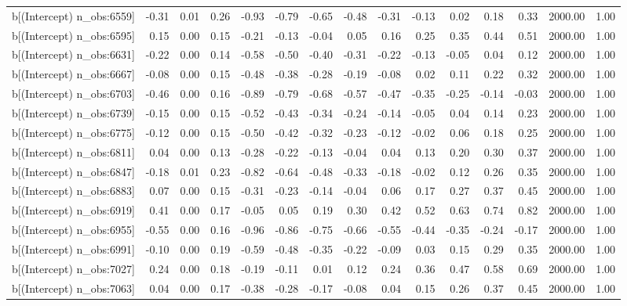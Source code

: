 \begin{table}[ht]
\begin{tabular}{rrrrrrrrrrrrrrr}
  b[(Intercept) n\_obs:6559] & -0.31 & 0.01 & 0.26 & -0.93 & -0.79 & -0.65 & -0.48 & -0.31 & -0.13 & 0.02 & 0.18 & 0.33 & 2000.00 & 1.00 \\ 
  b[(Intercept) n\_obs:6595] & 0.15 & 0.00 & 0.15 & -0.21 & -0.13 & -0.04 & 0.05 & 0.16 & 0.25 & 0.35 & 0.44 & 0.51 & 2000.00 & 1.00 \\ 
  b[(Intercept) n\_obs:6631] & -0.22 & 0.00 & 0.14 & -0.58 & -0.50 & -0.40 & -0.31 & -0.22 & -0.13 & -0.05 & 0.04 & 0.12 & 2000.00 & 1.00 \\ 
  b[(Intercept) n\_obs:6667] & -0.08 & 0.00 & 0.15 & -0.48 & -0.38 & -0.28 & -0.19 & -0.08 & 0.02 & 0.11 & 0.22 & 0.32 & 2000.00 & 1.00 \\ 
  b[(Intercept) n\_obs:6703] & -0.46 & 0.00 & 0.16 & -0.89 & -0.79 & -0.68 & -0.57 & -0.47 & -0.35 & -0.25 & -0.14 & -0.03 & 2000.00 & 1.00 \\ 
  b[(Intercept) n\_obs:6739] & -0.15 & 0.00 & 0.15 & -0.52 & -0.43 & -0.34 & -0.24 & -0.14 & -0.05 & 0.04 & 0.14 & 0.23 & 2000.00 & 1.00 \\ 
  b[(Intercept) n\_obs:6775] & -0.12 & 0.00 & 0.15 & -0.50 & -0.42 & -0.32 & -0.23 & -0.12 & -0.02 & 0.06 & 0.18 & 0.25 & 2000.00 & 1.00 \\ 
  b[(Intercept) n\_obs:6811] & 0.04 & 0.00 & 0.13 & -0.28 & -0.22 & -0.13 & -0.04 & 0.04 & 0.13 & 0.20 & 0.30 & 0.37 & 2000.00 & 1.00 \\ 
  b[(Intercept) n\_obs:6847] & -0.18 & 0.01 & 0.23 & -0.82 & -0.64 & -0.48 & -0.33 & -0.18 & -0.02 & 0.12 & 0.26 & 0.35 & 2000.00 & 1.00 \\ 
  b[(Intercept) n\_obs:6883] & 0.07 & 0.00 & 0.15 & -0.31 & -0.23 & -0.14 & -0.04 & 0.06 & 0.17 & 0.27 & 0.37 & 0.45 & 2000.00 & 1.00 \\ 
  b[(Intercept) n\_obs:6919] & 0.41 & 0.00 & 0.17 & -0.05 & 0.05 & 0.19 & 0.30 & 0.42 & 0.52 & 0.63 & 0.74 & 0.82 & 2000.00 & 1.00 \\ 
  b[(Intercept) n\_obs:6955] & -0.55 & 0.00 & 0.16 & -0.96 & -0.86 & -0.75 & -0.66 & -0.55 & -0.44 & -0.35 & -0.24 & -0.17 & 2000.00 & 1.00 \\ 
  b[(Intercept) n\_obs:6991] & -0.10 & 0.00 & 0.19 & -0.59 & -0.48 & -0.35 & -0.22 & -0.09 & 0.03 & 0.15 & 0.29 & 0.35 & 2000.00 & 1.00 \\ 
  b[(Intercept) n\_obs:7027] & 0.24 & 0.00 & 0.18 & -0.19 & -0.11 & 0.01 & 0.12 & 0.24 & 0.36 & 0.47 & 0.58 & 0.69 & 2000.00 & 1.00 \\ 
  b[(Intercept) n\_obs:7063] & 0.04 & 0.00 & 0.17 & -0.38 & -0.28 & -0.17 & -0.08 & 0.04 & 0.15 & 0.26 & 0.37 & 0.45 & 2000.00 & 1.00 \\ 

\end{tabular}
\end{table}
